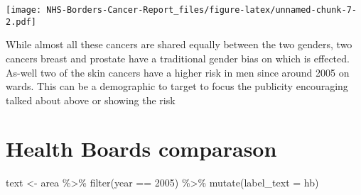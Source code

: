 \documentclass[
]{article}
\newenvironment{Shaded}{\begin{snugshade}}{\end{snugshade}}
\newcommand{\AttributeTok}[1]{\textcolor[rgb]{0.77,0.63,0.00}{#1}}
\newcommand{\DecValTok}[1]{\textcolor[rgb]{0.00,0.00,0.81}{#1}}
\newcommand{\FunctionTok}[1]{\textcolor[rgb]{0.00,0.00,0.00}{#1}}
\newcommand{\NormalTok}[1]{#1}
\newcommand{\OtherTok}[1]{\textcolor[rgb]{0.56,0.35,0.01}{#1}}
\newcommand{\SpecialCharTok}[1]{\textcolor[rgb]{0.00,0.00,0.00}{#1}}
\begin{document}
\texttt{[image: NHS-Borders-Cancer-Report\_files/figure-latex/unnamed-chunk-7-2.pdf]}

While almost all these cancers are shared equally between the two
genders, two cancers breast and prostate have a traditional gender bias
on which is effected. As-well two of the skin cancers have a higher risk
in men since around 2005 on wards. This can be a demographic to target
to focus the publicity encouraging talked about above or showing the
risk

\hypertarget{health-boards-comparason}{%
\section{Health Boards comparason}\label{health-boards-comparason}}

\begin{Shaded}
\begin{Highlighting}[]
\NormalTok{text }\OtherTok{\textless{}{-}}\NormalTok{ area }\SpecialCharTok{\%\textgreater{}\%}
  \FunctionTok{filter}\NormalTok{(year }\SpecialCharTok{==} \DecValTok{2005}\NormalTok{) }\SpecialCharTok{\%\textgreater{}\%} 
  \FunctionTok{mutate}\NormalTok{(}\AttributeTok{label\_text =}\NormalTok{ hb)}


\end{Highlighting}
\end{Shaded}
\end{document}
